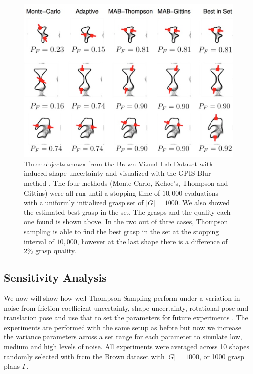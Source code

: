 \documentclass[10pt, conference]{ieeeconf}      %
\begin{document}
\begin{figure}%
\label{fig:shape_examples}
    \centering
    \includegraphics[width=16.5cm]{figures/shapes.png}%
  
    \caption{Three objects shown from the Brown Visual Lab Dataset with induced shape uncertainty and visualized with the GPIS-Blur method \cite{mahler2015gp}. The four methods (Monte-Carlo, Kehoe's, Thompson and Gittins) were all run until a stopping time of $10,000$ evaluations with a uniformly initialized grasp set of $|G|=1000$. We also showed the estimated best grasp in the set.  The grasps and the quality each one found is shown above.  In the two out of three cases, Thompson sampling is able to find the best grasp in the set at the stopping interval of $10,000$, however at the last shape there is a difference of $2\%$ grasp quality.   }%
    \label{fig:shape_samples}%
\end{figure}


\subsection{Sensitivity Analysis }\label{sec:sensitivity}
We now will show how well  Thompson Sampling perform under a variation in noise from friction coefficient uncertainty, shape uncertainty, rotational pose and translation pose and use that to set the parameters for future experiments . The experiments are performed with the same setup as before but now we increase the variance parameters across a set range for each parameter to simulate low, medium and high levels of noise. All experiments were averaged across 10 shapes randomly selected with from the Brown dataset with $|G| = 1000$, or 1000 grasp plans $\Gamma$. 
\end{document}
